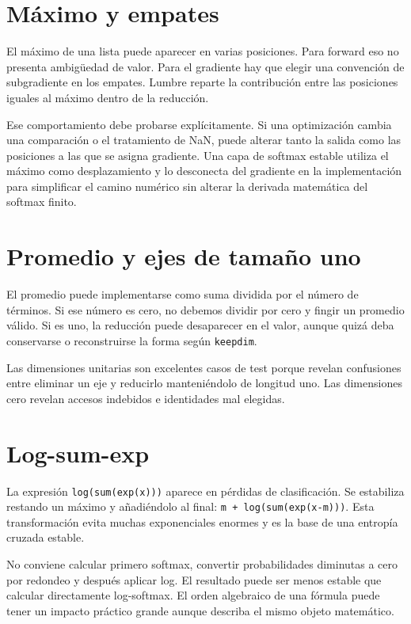 \documentclass[12pt,a4paper,oneside]{report}
\begin{document}
\section{Máximo y empates}
El máximo de una lista puede aparecer en varias posiciones. Para forward eso no presenta ambigüedad de valor. Para el gradiente hay que elegir una convención de subgradiente en los empates. Lumbre reparte la contribución entre las posiciones iguales al máximo dentro de la reducción.

Ese comportamiento debe probarse explícitamente. Si una optimización cambia una comparación o el tratamiento de NaN, puede alterar tanto la salida como las posiciones a las que se asigna gradiente. Una capa de softmax estable utiliza el máximo como desplazamiento y lo desconecta del gradiente en la implementación para simplificar el camino numérico sin alterar la derivada matemática del softmax finito.

\section{Promedio y ejes de tamaño uno}
El promedio puede implementarse como suma dividida por el número de términos. Si ese número es cero, no debemos dividir por cero y fingir un promedio válido. Si es uno, la reducción puede desaparecer en el valor, aunque quizá deba conservarse o reconstruirse la forma según \texttt{keepdim}.

Las dimensiones unitarias son excelentes casos de test porque revelan confusiones entre eliminar un eje y reducirlo manteniéndolo de longitud uno. Las dimensiones cero revelan accesos indebidos e identidades mal elegidas.

\section{Log-sum-exp}
La expresión \texttt{log(sum(exp(x)))} aparece en pérdidas de clasificación. Se estabiliza restando un máximo y añadiéndolo al final: \texttt{m + log(sum(\allowbreak{}exp(x-m)))}. Esta transformación evita muchas exponenciales enormes y es la base de una entropía cruzada estable.

No conviene calcular primero softmax, convertir probabilidades diminutas a cero por redondeo y después aplicar log. El resultado puede ser menos estable que calcular directamente log-softmax. El orden algebraico de una fórmula puede tener un impacto práctico grande aunque describa el mismo objeto matemático.
\end{document}
